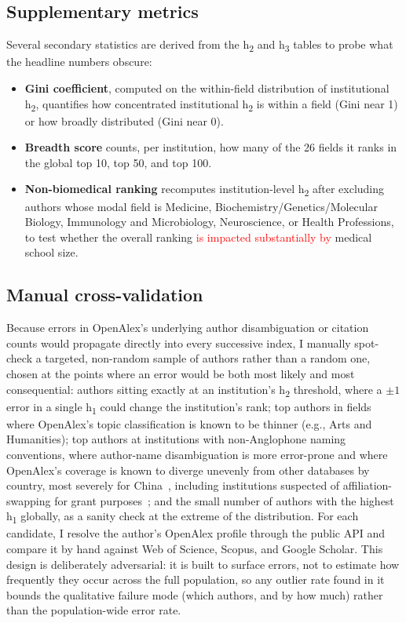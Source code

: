 \subsection{Supplementary metrics}
\label{subsec:methods-supplementary}
Several secondary statistics are derived from the h\textsubscript{2} and h\textsubscript{3} tables to probe what the headline numbers obscure:
\begin{itemize}
	\item \textbf{Gini coefficient}, computed on the within-field distribution of institutional h\textsubscript{2}, quantifies how concentrated institutional h\textsubscript{2} is within a field (Gini near 1) or how broadly distributed (Gini near 0).
	\item \textbf{Breadth score} counts, per institution, how many of the 26 fields it ranks in the global top 10, top 50, and top 100.
	\item \textbf{Non-biomedical ranking} recomputes institution-level h\textsubscript{2} after excluding authors whose modal field is Medicine, Biochemistry/Genetics/Molecular Biology, Immunology and Microbiology, Neuroscience, or Health Professions, to test whether the overall ranking \textcolor{red}{is impacted substantially by} medical school size.
\end{itemize}

\subsection{Manual cross-validation}
\label{subsec:methods-crossval}
Because errors in OpenAlex's underlying author disambiguation or citation counts would propagate directly into every successive index, I manually spot-check a targeted, non-random sample of authors rather than a random one, chosen at the points where an error would be both most likely and most consequential: authors sitting exactly at an institution's h\textsubscript{2} threshold, where a $\pm 1$ error in a single h\textsubscript{1} could change the institution's rank; top authors in fields where OpenAlex's topic classification is known to be thinner (e.g., Arts and Humanities); top authors at institutions with non-Anglophone naming conventions, where author-name disambiguation is more error-prone and where OpenAlex's coverage is known to diverge unevenly from other databases by country, most severely for China~\citep{zheng2025}, including institutions suspected of affiliation-swapping for grant purposes~\citep{saudi}; and the small number of authors with the highest h\textsubscript{1} globally, as a sanity check at the extreme of the distribution. For each candidate, I resolve the author's OpenAlex profile through the public API and compare it by hand against Web of Science, Scopus, and Google Scholar. This design is deliberately adversarial: it is built to surface errors, not to estimate how frequently they occur across the full population, so any outlier rate found in it bounds the qualitative failure mode (which authors, and by how much) rather than the population-wide error rate.

